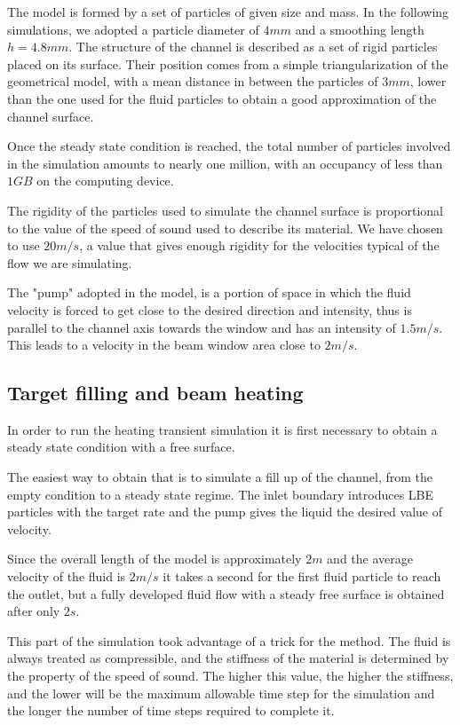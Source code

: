 \documentclass[a4paper, 11pt, twocolumn]{article}
\begin{document}
The model is formed by a set of particles of given size and mass. In the following simulations, we adopted a particle diameter of $4mm$ and a smoothing length $h = 4.8mm$. The structure of the channel is described as a set of rigid particles placed on its surface. Their position comes from a simple triangularization of the geometrical model, with a mean distance in between the particles of $3 mm$, lower than the one used for the fluid particles to obtain a good approximation of the channel surface.

Once the steady state condition is reached, the total number of particles involved in the simulation amounts to nearly one million, with an occupancy of less than $1GB$ on the computing device.

The rigidity of the particles used to simulate the channel surface is proportional to the value of the speed of sound used to describe its material. We have chosen to use $20m/s$, a value that gives enough rigidity for the velocities typical of the flow we are simulating.

The "pump" adopted in the model, is a portion of space in which the fluid velocity is forced to get close to the desired direction and intensity, thus is parallel to the channel axis towards the window and has an intensity of $1.5m/s$. This leads to a velocity in the beam window area close to $2m/s$.


\subsection{Target filling and beam heating}

In order to run the heating transient simulation it is first necessary to obtain a steady state condition with a free surface.

The easiest way to obtain that is to simulate a fill up of the channel, from the empty condition to a steady state regime. The inlet boundary introduces LBE particles with the target rate and the pump gives the liquid the desired value of velocity.

Since the overall length of the model is approximately $2m$ and the average velocity of the fluid is $2m/s$ it takes a second for the first fluid particle to reach the outlet, but a fully developed fluid flow with a steady free surface is obtained after only $2s$.

This part of the simulation took advantage of a trick for the method. The fluid is always treated as compressible, and the stiffness of the material is determined by the property of the speed of sound. The higher this value, the higher the stiffness, and the lower will be the maximum allowable time step for the simulation and the longer the number of time steps required to complete it.
\end{document}
